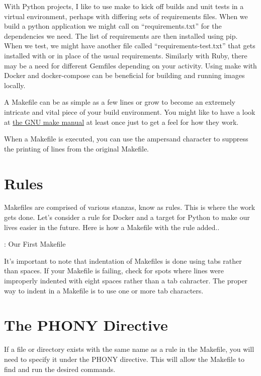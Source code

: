 \justify{}
With Python projects, I like to use make to kick off builds and unit tests in a virtual environment, perhaps with differing sets of requirements files. When we build a python application we might call on ``requirements.txt'' for the dependencies we need. The list of requirements are then installed using pip. When we test, we might have another file called ``requirements-test.txt'' that gets installed with or in place of the usual requirements. Similarly with Ruby, there may be a need for different Gemfiles depending on your activity. Using make with Docker and docker-compose can be beneficial for building and running images locally.

\justify{}
A Makefile can be as simple as a few lines or grow to become an extremely intricate and vital piece of your
build environment. You might like to have a look at
\href{https://www.gnu.org/software/make/manual/make.html#Introduction}{the GNU make manual} at least once just to get a feel for how they work.

\justify{}
When a Makefile is executed, you can use the ampersand character to suppress the printing of lines from the original Makefile.

\section{Rules}

\justify{}
Makefiles are comprised of various stanzas, know as rules. This is where the work gets done. Let's consider a rule
for Docker and a target for Python to make our lives easier in the future. Here is how a Makefile with the rule added..

\justify{}
\begin{mybox}{\thetcbcounter: Our First Makefile}
	
\end{mybox}

\justify{}
It's important to note that indentation of Makefiles is done using tabs rather than spaces. If your Makefile is failing, check for spots where lines were improperly
indented with eight spaces rather than a tab cahracter. The proper way to indent in a Makefile is to use one or more tab characters.

\section{The PHONY Directive}

\justify{}
If a file or directory exists with the same name as a rule in the Makefile, you will need to specify
it under the PHONY directive. This will allow the Makefile to find and run the desired commands.

